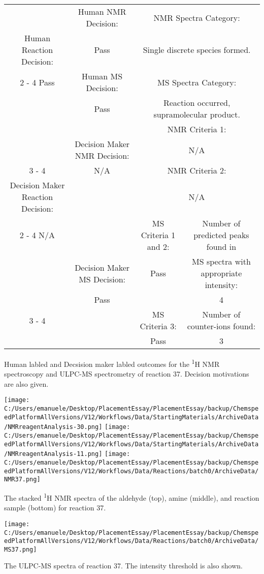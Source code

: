 \documentclass{article}%
\begin{document}
\begin{Decision Table}[H]%
\begin{tabular}{|c|c|c|c|}%
\hline%
&Human NMR Decision:&\multicolumn{2}{|c|}{NMR Spectra Category:}\\%
Human Reaction Decision:&Pass&\multicolumn{2}{|c|}{Single discrete species formed.}\\%
\cline{2%
-%
4}%
Pass&Human MS Decision:&\multicolumn{2}{|c|}{MS Spectra Category:}\\%
&Pass&\multicolumn{2}{|c|}{Reaction occurred, supramolecular product.}\\%
\hline%
&&\multicolumn{2}{|c|}{NMR Criteria 1:}\\%
&Decision Maker NMR Decision:&\multicolumn{2}{|c|}{N/A}\\%
\cline{3%
-%
4}%
&N/A&\multicolumn{2}{|c|}{NMR Criteria 2:}\\%
Decision Maker Reaction Decision:&&\multicolumn{2}{|c|}{N/A}\\%
\cline{2%
-%
4}%
N/A&&MS Criteria 1 and 2:&Number of predicted peaks found in\\%
&Decision Maker MS Decision:&Pass&MS spectra with appropriate intensity:\\%
&Pass&&4\\%
\cline{3%
-%
4}%
&&MS Criteria 3:&Number of counter{-}ions found:\\%
&&Pass&3\\%
\hline%
\end{tabular}%
\caption{Human labled and Decsision maker labled outcomes for the \textsuperscript{1}H NMR spectroscopy and ULPC-MS spectrometry of reaction 37. Decision motivations are also given.}%
\end{Decision Table}%
\begin{NMR Spectra}[H]%
\begin{center}%
\texttt{[image: C:/Users/emanuele/Desktop/PlacementEssay/PlacementEssay/backup/ChemspeedPlatformAllVersions/V12/Workflows/Data/StartingMaterials/ArchiveData/NMRreagentAnalysis-30.png]}\hfill%
\texttt{[image: C:/Users/emanuele/Desktop/PlacementEssay/PlacementEssay/backup/ChemspeedPlatformAllVersions/V12/Workflows/Data/StartingMaterials/ArchiveData/NMRreagentAnalysis-11.png]}\hfill%
\texttt{[image: C:/Users/emanuele/Desktop/PlacementEssay/PlacementEssay/backup/ChemspeedPlatformAllVersions/V12/Workflows/Data/Reactions/batch0/ArchiveData/NMR37.png]}\hfill%
\end{center}%
\caption{The stacked \textsuperscript{1}H NMR spectra of the aldehyde (top), amine (middle), and reaction sample (bottom) for reaction 37.}%
\end{NMR Spectra}%
\begin{MS Spectra}[H]%
\begin{center}%
\texttt{[image: C:/Users/emanuele/Desktop/PlacementEssay/PlacementEssay/backup/ChemspeedPlatformAllVersions/V12/Workflows/Data/Reactions/batch0/ArchiveData/MS37.png]}\hfill%
\end{center}%
\caption{The ULPC-MS spectra of reaction 37. The intensity threshold is also shown.}%
\end{MS Spectra}%
\end{document}
